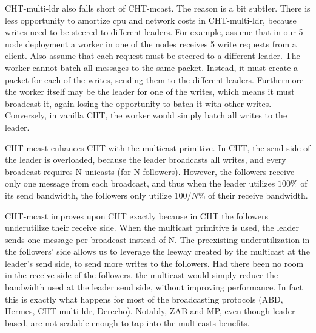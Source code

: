 CHT-multi-ldr also falls short of CHT-mcast. The reason is a bit subtler. There is less opportunity to amortize cpu and network costs in CHT-multi-ldr, because writes need to be steered to different leaders. 
For example, assume that in our 5-node deployment a worker in one of the nodes receives 5 write requests from a client. Also assume that each request must be steered to a different leader. The worker cannot batch all messages to the same packet. Instead, it must create a packet for each of the writes, sending them to the different leaders. Furthermore the worker itself may be the leader for one of the writes, which means it must broadcast it, again losing the opportunity to batch it with other writes. 
Conversely, in vanilla CHT, the worker would simply batch all writes to the leader.

CHT-mcast enhances CHT with the multicast primitive.
In CHT, the send side of the leader is overloaded, because the leader broadcasts all writes, and every broadcast requires N unicasts (for N followers). However, the followers receive only one message from each broadcast, and thus when the leader utilizes $100$\% of its send bandwidth, the followers only utilize  $100/N$\% of their receive bandwidth.

CHT-mcast improves upon CHT exactly because in CHT the followers underutilize their receive side.
When the multicast primitive is used, the leader sends one message per broadcast instead of N. The preexisting underutilization in the followers' side allows us to leverage the leeway created by the multicast at the leader's send side, to send more writes to the followers.
Had there been no room in the receive side of the followers, the multicast would simply reduce the bandwidth used at the leader send side, without improving performance.
In fact this is exactly what happens for most of the broadcasting protocols (ABD, Hermes, CHT-multi-ldr, Derecho).
Notably, ZAB and MP, even though leader-based, are not scalable enough to tap into the multicasts benefits. %

